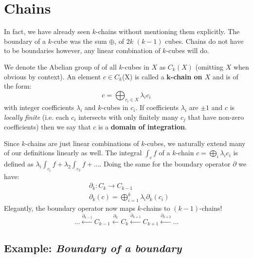 %
%
\section{Chains}

In fact, we have already seen $k$-chains without mentioning them explicitly.
The boundary of a $k$-cube was the sum $\oplus$, of $2k$ $(k-1)$ cubes.
Chains do not have to be boundaries however, any linear combination of $k$-cubes will do.


\begin{definition}
We denote the Abelian group of of all $k$-cubes in $X$ as $C_k(X)$ (omitting $X$ when obvious by context).
An element $c \in C_k$(X) is called a \textbf{$\boldsymbol{k}$-chain on $X$} and is of the form:
\begin{equation}
	c = \bigoplus_{c_i \in X} \lambda_i c_i
\end{equation}
with integer coefficients $\lambda_i$ and  $k$-cubes in $c_i$.
If coefficients $\lambda_i$ are $\pm 1$ and $c$ is \emph{locally finite} (i.e. each $c_i$ intersects with only finitely many $c_j$ that have non-zero coefficients) then we say that $c$ is a \textbf{domain of integration}.
\end{definition}


		
Since $k$-chains are just linear combinations of $k$-cubes, we naturally extend many of our definitions linearly as well.
The integral $\int_c f$ of a $k$-chain $c=\bigoplus_i \lambda_i c_i$ is defined as $\lambda_i \int_{c_i} f  + \lambda_2 \int_{c_2} f + \ldots$.
Doing the same for the boundary operator $\partial$ we have:
\begin{align*}
	&\partial_k: C_k \to C_{k-1} \\
	&\partial_k(c) = \bigoplus_{i=1}^k \lambda_i \partial_k(c_i)
\end{align*}
Elegantly, the boundary operator now maps $k$-chains to $(k-1)$-chains!
\begin{equation}
	\ldots \xleftarrow{\partial_{k-1}} C_{k-1} \xleftarrow{\partial_{k}} C_k \xleftarrow{\partial_{k+1}} C_{k+1} \xleftarrow{\partial_{k+2}} ...
\end{equation}





\subsection{Example: \emph{Boundary of a boundary}}

